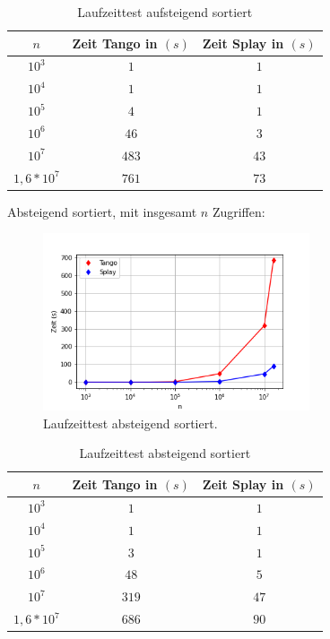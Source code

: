\documentclass[a4paper,12pt]{article}
\begin{document}
\begin{table}[H]
	\begin{center}
		\begin{tabular}[c]{|c|c|c|}
			\hline
			$n$ & Zeit Tango in $\left(s\right)$ &Zeit Splay in $\left(s\right)$ \\
			\hline
			$10^3$ & $1$ &$1$ \\
			\hline
			$10^4$  & $1$ &$1$  \\
			\hline
			$10^5$  & $4$ &$1$  \\
			\hline
			$10^6$  & $46$ &$3$  \\
			\hline
			$10^7$  & $483$ &$43$  \\
			\hline
			$1,6 *10^7$  & $761$ &$73$  \\
			\hline
		\end{tabular}
		\caption{Laufzeittest aufsteigend sortiert} 
	\end{center}
\end{table}
\newpage
\noindent Absteigend sortiert, mit insgesamt $n$ Zugriffen:
\begin{figure}[H]
	\centering
	\includegraphics[width=0.7\textwidth]{"Medien/laufzeittest/diagramm/sorted2"}
	\caption{Laufzeittest absteigend sortiert.}
\end{figure}
\begin{table}[H]
	\begin{center}
		\begin{tabular}[c]{|c|c|c|}
			\hline
			$n$ & Zeit Tango in $\left(s\right)$ &Zeit Splay in $\left(s\right)$ \\
			\hline
			$10^3$ & $1$ &$1$ \\
			\hline
			$10^4$  & $1$ &$1$  \\
			\hline
			$10^5$  & $3$ &$1$  \\
			\hline
			$10^6$  & $48$ &$5$  \\
			\hline
			$10^7$  & $319$ &$47$  \\
			\hline
			$1,6 *10^7$  & $686$ &$90$  \\
			\hline
		\end{tabular}
		\caption{Laufzeittest absteigend sortiert} 
	\end{center}
\end{table}
\end{document}
